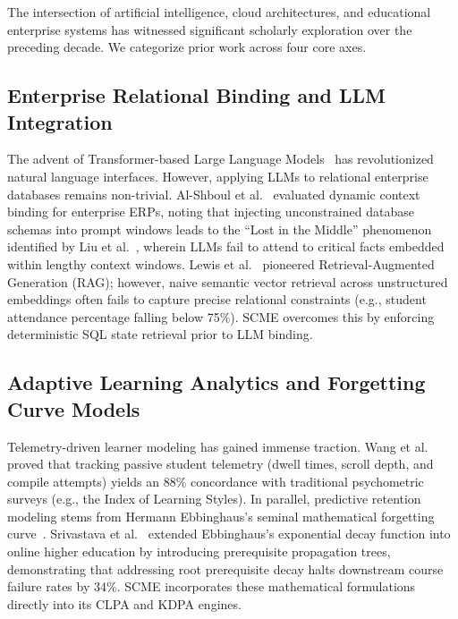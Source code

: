 \documentclass[11pt,a4paper]{article}
\begin{document}
The intersection of artificial intelligence, cloud architectures, and educational enterprise systems has witnessed significant scholarly exploration over the preceding decade. We categorize prior work across four core axes.

\subsection{Enterprise Relational Binding and LLM Integration}
The advent of Transformer-based Large Language Models~\cite{vaswani2017attention} has revolutionized natural language interfaces. However, applying LLMs to relational enterprise databases remains non-trivial. Al-Shboul et al.~\cite{alshboul2025dynamic} evaluated dynamic context binding for enterprise ERPs, noting that injecting unconstrained database schemas into prompt windows leads to the ``Lost in the Middle'' phenomenon identified by Liu et al.~\cite{liu2024lost}, wherein LLMs fail to attend to critical facts embedded within lengthy context windows. Lewis et al.~\cite{lewis2020retrieval} pioneered Retrieval-Augmented Generation (RAG); however, naive semantic vector retrieval across unstructured embeddings often fails to capture precise relational constraints (e.g., student attendance percentage falling below 75\%). SCME overcomes this by enforcing deterministic SQL state retrieval prior to LLM binding.

\subsection{Adaptive Learning Analytics and Forgetting Curve Models}
Telemetry-driven learner modeling has gained immense traction. Wang et al.~\cite{wang2024adaptive} proved that tracking passive student telemetry (dwell times, scroll depth, and compile attempts) yields an 88\% concordance with traditional psychometric surveys (e.g., the Index of Learning Styles). In parallel, predictive retention modeling stems from Hermann Ebbinghaus's seminal mathematical forgetting curve~\cite{ebbinghaus1885memory}. Srivastava et al.~\cite{srivastava2024predictive} extended Ebbinghaus's exponential decay function into online higher education by introducing prerequisite propagation trees, demonstrating that addressing root prerequisite decay halts downstream course failure rates by 34\%. SCME incorporates these mathematical formulations directly into its CLPA and KDPA engines.
\end{document}
